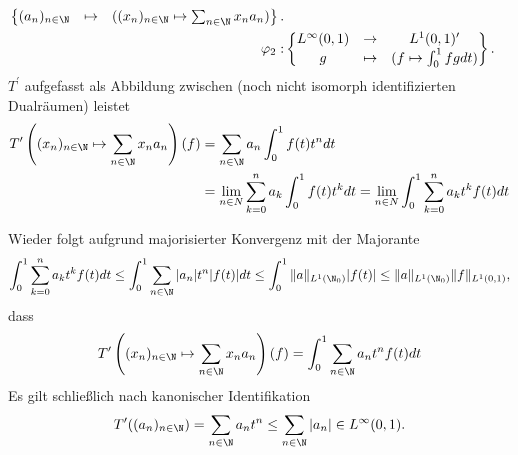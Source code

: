 \begin{solution}
\begin{align*}
\begin{Bmatrix}
    (a_n)_{n \in \N} &\mapsto & ((x_n)_{n \in \N} \mapsto \sum_{n \in \N}x_na_n)
  \end{Bmatrix}. \\
  \varphi_2:& \begin{Bmatrix}
    L^\infty(0, 1) & \to & L^1(0, 1)^{\prime} \\
    g &\mapsto & (f \mapsto \int_0^1 fg dt)
  \end{Bmatrix}.
\end{align*}
$T^{\prime}$ aufgefasst als Abbildung zwischen (noch nicht isomorph identifizierten
Dualräumen) leistet
\begin{align*}
  T^{\prime}\left((x_n)_{n \in \N} \mapsto \sum_{n \in \N}x_na_n\right)(f)
  &= \sum_{n \in \N}a_n\int_0^1 f(t)t^n dt \\
  &= \lim_{n \in N} \sum_{k= 0}^n a_k \int_0^1 f(t)t^k dt
  = \lim_{n \in N}  \int_0^1\sum_{k= 0}^n a_k t^k f(t) dt
\end{align*}

Wieder folgt aufgrund majorisierter Konvergenz mit der Majorante
\begin{align*}
  \int_0^1 \sum_{k=0}^n a_kt^k f(t)dt \leq \int_0^1 \sum_{n \in \N} |a_n|t^n|f(t)| dt
  \leq \int_0^1 \|a\|_{L^1(\N_0)}|f(t)| \leq \|a\|_{L^1(\N_0)}\|f\|_{L^1(0,1)},
\end{align*}
dass
\begin{align*}
  T^{\prime}\left((x_n)_{n \in \N} \mapsto \sum_{n \in \N}x_na_n\right)(f)
  = \int_0^1\sum_{n \in \N} a_n t^nf(t) dt
\end{align*}
Es gilt schließlich nach kanonischer Identifikation
\begin{align*}
  T^{\prime}((a_n)_{n \in\N}) = \sum_{n \in \N}a_n t^n \leq \sum_{n \in \N}|a_n| \in L^\infty(0, 1).
\end{align*}
\end{solution}
